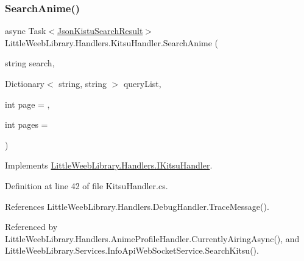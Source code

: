 \subsubsection{\texorpdfstring{Search\+Anime()}{SearchAnime()}}
{\footnotesize\ttfamily async Task$<$\mbox{\hyperlink{class_little_weeb_library_1_1_models_1_1_json_kistu_search_result}{Json\+Kistu\+Search\+Result}}$>$ Little\+Weeb\+Library.\+Handlers.\+Kitsu\+Handler.\+Search\+Anime (\begin{DoxyParamCaption}\item[{string}]{search,  }\item[{Dictionary$<$ string, string $>$}]{query\+List,  }\item[{int}]{page = {},  }\item[{int}]{pages = {} }\end{DoxyParamCaption})}



Implements \mbox{\hyperlink{interface_little_weeb_library_1_1_handlers_1_1_i_kitsu_handler_a4afb4a1718099f9e4e39ebc237ae45a0}{Little\+Weeb\+Library.\+Handlers.\+I\+Kitsu\+Handler}}.



Definition at line 42 of file Kitsu\+Handler.\+cs.



References Little\+Weeb\+Library.\+Handlers.\+Debug\+Handler.\+Trace\+Message().



Referenced by Little\+Weeb\+Library.\+Handlers.\+Anime\+Profile\+Handler.\+Currently\+Airing\+Async(), and Little\+Weeb\+Library.\+Services.\+Info\+Api\+Web\+Socket\+Service.\+Search\+Kitsu().


